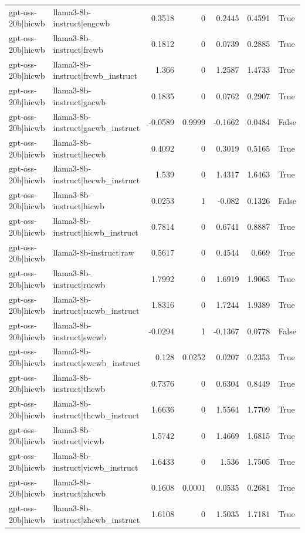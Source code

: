\begin{table}
\begin{tabular}{l l r r r r l}
gpt-oss-20b|hicwb & llama3-8b-instruct|engcwb & 0.3518 & 0 & 0.2445 & 0.4591 & True \\
gpt-oss-20b|hicwb & llama3-8b-instruct|frcwb & 0.1812 & 0 & 0.0739 & 0.2885 & True \\
gpt-oss-20b|hicwb & llama3-8b-instruct|frcwb_instruct & 1.366 & 0 & 1.2587 & 1.4733 & True \\
gpt-oss-20b|hicwb & llama3-8b-instruct|gacwb & 0.1835 & 0 & 0.0762 & 0.2907 & True \\
gpt-oss-20b|hicwb & llama3-8b-instruct|gacwb_instruct & -0.0589 & 0.9999 & -0.1662 & 0.0484 & False \\
gpt-oss-20b|hicwb & llama3-8b-instruct|hecwb & 0.4092 & 0 & 0.3019 & 0.5165 & True \\
gpt-oss-20b|hicwb & llama3-8b-instruct|hecwb_instruct & 1.539 & 0 & 1.4317 & 1.6463 & True \\
gpt-oss-20b|hicwb & llama3-8b-instruct|hicwb & 0.0253 & 1 & -0.082 & 0.1326 & False \\
gpt-oss-20b|hicwb & llama3-8b-instruct|hicwb_instruct & 0.7814 & 0 & 0.6741 & 0.8887 & True \\
gpt-oss-20b|hicwb & llama3-8b-instruct|raw & 0.5617 & 0 & 0.4544 & 0.669 & True \\
gpt-oss-20b|hicwb & llama3-8b-instruct|rucwb & 1.7992 & 0 & 1.6919 & 1.9065 & True \\
gpt-oss-20b|hicwb & llama3-8b-instruct|rucwb_instruct & 1.8316 & 0 & 1.7244 & 1.9389 & True \\
gpt-oss-20b|hicwb & llama3-8b-instruct|swcwb & -0.0294 & 1 & -0.1367 & 0.0778 & False \\
gpt-oss-20b|hicwb & llama3-8b-instruct|swcwb_instruct & 0.128 & 0.0252 & 0.0207 & 0.2353 & True \\
gpt-oss-20b|hicwb & llama3-8b-instruct|thcwb & 0.7376 & 0 & 0.6304 & 0.8449 & True \\
gpt-oss-20b|hicwb & llama3-8b-instruct|thcwb_instruct & 1.6636 & 0 & 1.5564 & 1.7709 & True \\
gpt-oss-20b|hicwb & llama3-8b-instruct|vicwb & 1.5742 & 0 & 1.4669 & 1.6815 & True \\
gpt-oss-20b|hicwb & llama3-8b-instruct|vicwb_instruct & 1.6433 & 0 & 1.536 & 1.7505 & True \\
gpt-oss-20b|hicwb & llama3-8b-instruct|zhcwb & 0.1608 & 0.0001 & 0.0535 & 0.2681 & True \\
gpt-oss-20b|hicwb & llama3-8b-instruct|zhcwb_instruct & 1.6108 & 0 & 1.5035 & 1.7181 & True \\

\end{tabular}
\end{table}
